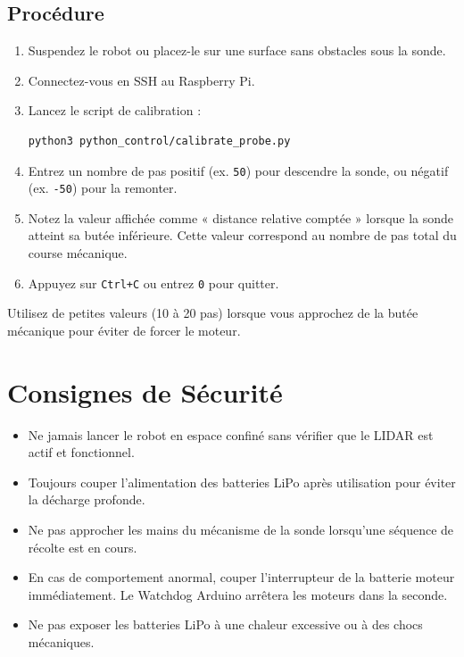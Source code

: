 \documentclass [12pt, a4paper]{article}
\begin{document}
\subsection{Procédure}
\begin{enumerate}
    \item Suspendez le robot ou placez-le sur une surface sans obstacles sous la sonde.
    \item Connectez-vous en SSH au Raspberry Pi.
    \item Lancez le script de calibration :
\begin{verbatim}
python3 python_control/calibrate_probe.py
\end{verbatim}
    \item Entrez un nombre de pas positif (ex. \texttt{50}) pour descendre la sonde, ou négatif (ex. \texttt{-50}) pour la remonter.
    \item Notez la valeur affichée comme « distance relative comptée » lorsque la sonde atteint sa butée inférieure. Cette valeur correspond au nombre de pas total du course mécanique.
    \item Appuyez sur \texttt{Ctrl+C} ou entrez \texttt{0} pour quitter.
\end{enumerate}

Utilisez de petites valeurs (10 à 20 pas) lorsque vous approchez de la butée mécanique pour éviter de forcer le moteur.

\section{Consignes de Sécurité}

\begin{itemize}
    \item Ne jamais lancer le robot en espace confiné sans vérifier que le LIDAR est actif et fonctionnel.
    \item Toujours couper l'alimentation des batteries LiPo après utilisation pour éviter la décharge profonde.
    \item Ne pas approcher les mains du mécanisme de la sonde lorsqu'une séquence de récolte est en cours.
    \item En cas de comportement anormal, couper l'interrupteur de la batterie moteur immédiatement. Le Watchdog Arduino arrêtera les moteurs dans la seconde.
    \item Ne pas exposer les batteries LiPo à une chaleur excessive ou à des chocs mécaniques.
\end{itemize}
\end{document}
